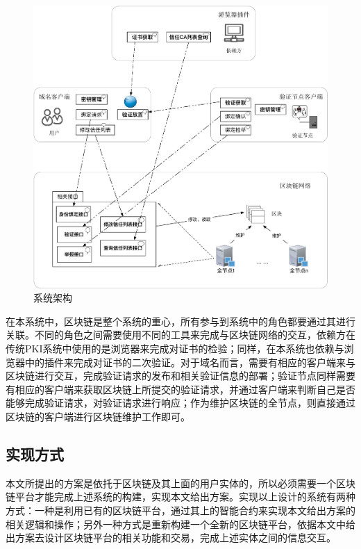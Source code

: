 \begin{figure}[!htbp]
 	\centering
 	\includegraphics[width=1 \textwidth]{img/framework}
 	\caption{系统架构}\label{fig:framework}
\end{figure}



在本系统中，区块链是整个系统的重心，所有参与到系统中的角色都要通过其进行关联。不同的角色之间需要使用不同的工具来完成与区块链网络的交互，依赖方在传统PKI系统中使用的是浏览器来完成对证书的检验；同样，在本系统也依赖与浏览器中的插件来完成对证书的二次验证。对于域名而言，需要有相应的客户端来与区块链进行交互，完成验证请求的发布和相关验证信息的部署；验证节点同样需要有相应的客户端来获取区块链上所提交的验证请求，并通过客户端来判断自己是否能够完成验证请求，对验证请求进行响应；作为维护区块链的全节点，则直接通过区块链的客户端进行区块链维护工作即可。

\subsection{实现方式}

本文所提出的方案是依托于区块链及其上面的用户实体的，所以必须需要一个区块链平台才能完成上述系统的构建，实现本文给出方案。实现以上设计的系统有两种方式：一种是利用已有的区块链平台，通过其上的智能合约来实现本文给出方案的相关逻辑和操作；另外一种方式是重新构建一个全新的区块链平台，依据本文中给出方案去设计区块链平台的相关功能和交易，完成上述实体之间的信息交互。

